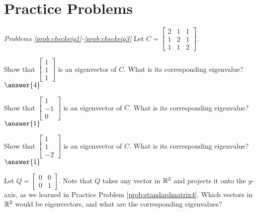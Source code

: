 \documentclass{ximera}
\begin{document}
\section*{Practice Problems}
    
\emph{Problems \ref{prob:checkeig1}-\ref{prob:checkeig3}}
Let $C=\begin{bmatrix} 2 & 1 & 1\\ 1 & 2 & 1\\ 1 & 1 & 2\end{bmatrix}$. 
    
\begin{problem}\label{prob:checkeig1}
Show that $\begin{bmatrix} 1\\1\\1 \end{bmatrix}$ is an eigenvector of $C$.  What is its corresponding eigenvalue?
$\answer{4}$
\end{problem}
    
    \begin{problem}\label{prob:checkeig2}
Show that $\begin{bmatrix} 1\\-1\\0 \end{bmatrix}$ is an eigenvector of $C$.  What is its corresponding eigenvalue?
$\answer{1}$
\end{problem}
    
    \begin{problem}\label{prob:checkeig3}
Show that $\begin{bmatrix} 1\\1\\-2 \end{bmatrix}$ is an eigenvector of $C$.  What is its corresponding eigenvalue?
$\answer{1}$
\end{problem}
    
    
\begin{problem}\label{prob:eigprojmatrix}
Let $Q=\begin{bmatrix} 0& 0\\ 0&1\end{bmatrix}$.  Note that $Q$ takes any vector in $\mathbb{R}^2$ and projects it onto the $y$-axis, as we learned in Practice Problem \ref{prob:standardmatrix4}.  Which vectors in $\mathbb{R}^2$ would be eigenvectors, and what are the corresponding eigenvalues?
\end{problem}
    
\end{document}
